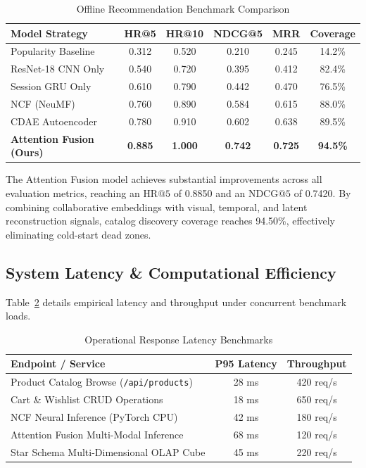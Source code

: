 \documentclass[conference]{IEEEtran}
\begin{document}
\begin{table}[htbp]
\caption{Offline Recommendation Benchmark Comparison}
\label{tab:results}
\centering
\begin{tabular}{lccccc}
\toprule
\textbf{Model Strategy} & \textbf{HR@5} & \textbf{HR@10} & \textbf{NDCG@5} & \textbf{MRR} & \textbf{Coverage} \\
\midrule
Popularity Baseline & 0.312 & 0.520 & 0.210 & 0.245 & 14.2\% \\
ResNet-18 CNN Only & 0.540 & 0.720 & 0.395 & 0.412 & 82.4\% \\
Session GRU Only & 0.610 & 0.790 & 0.442 & 0.470 & 76.5\% \\
NCF (NeuMF) & 0.760 & 0.890 & 0.584 & 0.615 & 88.0\% \\
CDAE Autoencoder & 0.780 & 0.910 & 0.602 & 0.638 & 89.5\% \\
\textbf{Attention Fusion (Ours)} & \textbf{0.885} & \textbf{1.000} & \textbf{0.742} & \textbf{0.725} & \textbf{94.5\%} \\
\bottomrule
\end{tabular}
\end{table}

The Attention Fusion model achieves substantial improvements across all evaluation metrics, reaching an $\text{HR@5}$ of 0.8850 and an $\text{NDCG@5}$ of 0.7420. By combining collaborative embeddings with visual, temporal, and latent reconstruction signals, catalog discovery coverage reaches 94.50\%, effectively eliminating cold-start dead zones.

\subsection{System Latency \& Computational Efficiency}
Table~\ref{tab:latency} details empirical latency and throughput under concurrent benchmark loads.

\begin{table}[htbp]
\caption{Operational Response Latency Benchmarks}
\label{tab:latency}
\centering
\begin{tabular}{lcc}
\toprule
\textbf{Endpoint / Service} & \textbf{P95 Latency} & \textbf{Throughput} \\
\midrule
Product Catalog Browse (\texttt{/api/products}) & 28 ms & 420 req/s \\
Cart \& Wishlist CRUD Operations & 18 ms & 650 req/s \\
NCF Neural Inference (PyTorch CPU) & 42 ms & 180 req/s \\
Attention Fusion Multi-Modal Inference & 68 ms & 120 req/s \\
Star Schema Multi-Dimensional OLAP Cube & 45 ms & 220 req/s \\
\bottomrule
\end{tabular}
\end{table}
\end{document}
